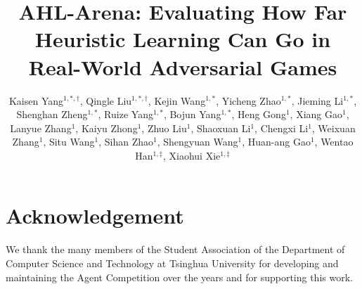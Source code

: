 \documentclass[]{style/company_light}
\title{AHL-Arena: Evaluating How Far Heuristic Learning Can Go in Real-World Adversarial Games}
\author{Kaisen Yang$^{1,*,\dagger}$, Qingle Liu$^{1,*,\dagger}$, Kejin Wang$^{1,*}$, Yicheng Zhao$^{1,*}$, Jieming Li$^{1,*}$, Shenghan Zheng$^{1,*}$, Ruize Yang$^{1,*}$, Bojun Yang$^{1,*}$, Heng Gong$^{1}$, Xiang Gao$^{1}$, Lanyue Zhang$^{1}$, Kaiyu Zhong$^{1}$, Zhuo Liu$^{1}$, Shaoxuan Li$^{1}$, Chengxi Li$^{1}$, Weixuan Zhang$^{1}$, Situ Wang$^{1}$, Sihan Zhao$^{1}$, Shengyuan Wang$^{1}$, Huan-ang Gao$^{1}$, Wentao Han$^{1,\ddagger}$, Xiaohui Xie$^{1,\ddagger}$}
\affiliation{$^{1}$ Department of Computer Science and Technology, Tsinghua University}
\begin{document}
\maketitle









\section*{Acknowledgement}
We thank the many members of the Student Association of the Department of Computer Science and Technology at Tsinghua University for developing and maintaining the Agent Competition over the years and for supporting this work.
\end{document}
